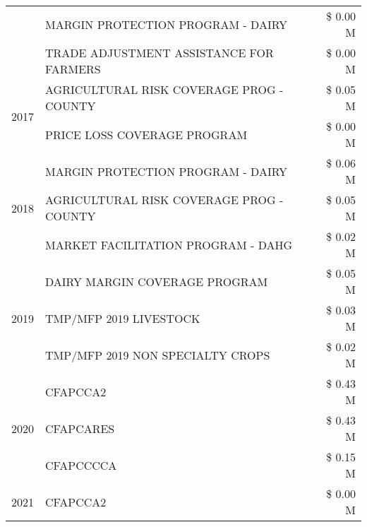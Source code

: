 \begin{tabular}{llr}
 & MARGIN PROTECTION PROGRAM - DAIRY & \$ 0.00 M \\
 & TRADE ADJUSTMENT ASSISTANCE FOR FARMERS & \$ 0.00 M \\
\cline{1-3}
\multirow[t]{2}{*}{2017} & AGRICULTURAL RISK COVERAGE PROG - COUNTY & \$ 0.05 M \\
 & PRICE LOSS COVERAGE PROGRAM & \$ 0.00 M \\
\cline{1-3}
\multirow[t]{3}{*}{2018} & MARGIN PROTECTION PROGRAM - DAIRY & \$ 0.06 M \\
 & AGRICULTURAL RISK COVERAGE PROG - COUNTY & \$ 0.05 M \\
 & MARKET FACILITATION PROGRAM - DAHG & \$ 0.02 M \\
\cline{1-3}
\multirow[t]{3}{*}{2019} & DAIRY MARGIN COVERAGE PROGRAM & \$ 0.05 M \\
 & TMP/MFP 2019 LIVESTOCK & \$ 0.03 M \\
 & TMP/MFP 2019 NON SPECIALTY CROPS & \$ 0.02 M \\
\cline{1-3}
\multirow[t]{3}{*}{2020} & CFAPCCA2 & \$ 0.43 M \\
 & CFAPCARES & \$ 0.43 M \\
 & CFAPCCCCA & \$ 0.15 M \\
\cline{1-3}
2021 & CFAPCCA2 & \$ 0.00 M \\
\cline{1-3}
\bottomrule
\end{tabular}
